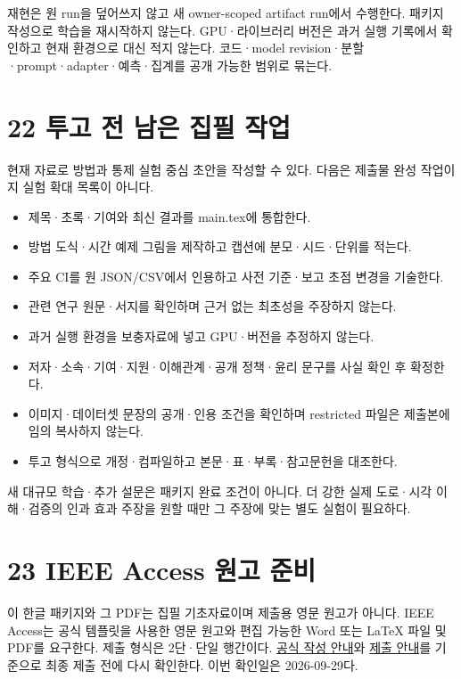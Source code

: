 \documentclass[11pt,a4paper]{article}
\begin{document}
재현은 원 run을 덮어쓰지 않고 새 owner-scoped artifact run에서 수행한다. 패키지 작성으로 학습을 재시작하지 않는다. GPU·라이브러리 버전은 과거 실행 기록에서 확인하고 현재 환경으로 대신 적지 않는다. 코드·model revision·분할·prompt·adapter·예측·집계를 공개 가능한 범위로 묶는다.\par

\clearpage{}\section*{22 투고 전 남은 집필 작업}

현재 자료로 방법과 통제 실험 중심 초안을 작성할 수 있다. 다음은 제출물 완성 작업이지 실험 확대 목록이 아니다.\par

\begin{itemize}
\item 제목·초록·기여와 최신 결과를 main.tex에 통합한다.
\item 방법 도식·시간 예제 그림을 제작하고 캡션에 분모·시드·단위를 적는다.
\item 주요 CI를 원 JSON/CSV에서 인용하고 사전 기준·보고 초점 변경을 기술한다.
\item 관련 연구 원문·서지를 확인하며 근거 없는 최초성을 주장하지 않는다.
\item 과거 실행 환경을 보충자료에 넣고 GPU·버전을 추정하지 않는다.
\item 저자·소속·기여·지원·이해관계·공개 정책·윤리 문구를 사실 확인 후 확정한다.
\item 이미지·데이터셋 문장의 공개·인용 조건을 확인하며 restricted 파일은 제출본에 임의 복사하지 않는다.
\item 투고 형식으로 개정·컴파일하고 본문·표·부록·참고문헌을 대조한다.
\end{itemize}

새 대규모 학습·추가 설문은 패키지 완료 조건이 아니다. 더 강한 실제 도로·시각 이해·검증의 인과 효과 주장을 원할 때만 그 주장에 맞는 별도 실험이 필요하다.\par

\clearpage{}\section*{23 IEEE Access 원고 준비}

이 한글 패키지와 그 PDF는 집필 기초자료이며 제출용 영문 원고가 아니다. IEEE Access는 공식 템플릿을 사용한 영문 원고와 편집 가능한 Word 또는 LaTeX 파일 및 PDF를 요구한다. 제출 형식은 2단·단일 행간이다. \href{\detokenize{https://ieeeaccess.ieee.org/authors/preparing-your-article/}}{공식 작성 안내}와 \href{\detokenize{https://ieeeaccess.ieee.org/authors/submission-guidelines/}}{제출 안내}를 기준으로 최종 제출 전에 다시 확인한다. 이번 확인일은 2026-09-29다.\par
\end{document}
